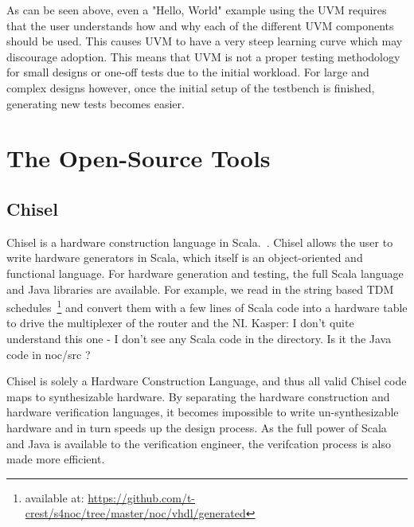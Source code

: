 \documentclass[conference]{IEEEtran}
\newcommand{\martin}[1]{{\color{blue} Martin: #1}}
\newcommand{\ducky}[1]{{\color{orange} Richard: #1}}
\newcommand{\kasper}[1]{{\color{purple} Kasper: #1}}
\begin{document}
As can be seen above, even a "Hello, World" example using the UVM requires that the user understands how and why each of the different UVM components should be used. This causes UVM to have a very steep learning curve which may discourage adoption. This means that UVM is not a proper testing methodology for small designs or one-off tests due to the initial workload. For large and complex designs however, once the initial setup of the testbench is finished, generating new tests becomes easier.


\section{The Open-Source Tools}

\subsection{Chisel}

Chisel is a hardware construction language in Scala.~\cite{chisel:dac2012}.
Chisel allows the user to write hardware generators in Scala, which itself is an object-oriented and functional language. For hardware generation and testing, the full Scala language and Java
libraries are available. For example, we read in the string based TDM
schedules~\footnote{available at: \url{https://github.com/t-crest/s4noc/tree/master/noc/vhdl/generated}}
and convert them with a few lines of Scala code into a hardware table to
drive the multiplexer of the router and the NI. \kasper{I don't quite understand this one - I don't see any Scala code in the directory. Is it the Java code in noc/src ?}

Chisel is solely a Hardware Construction Language, and thus all valid Chisel code maps to synthesizable hardware. By separating the hardware construction and hardware verification languages, it becomes impossible to write un-synthesizable hardware and in turn speeds up the design process. As the full power of Scala and Java is available to the verification engineer, the verifcation process is also made more efficient.
\end{document}
